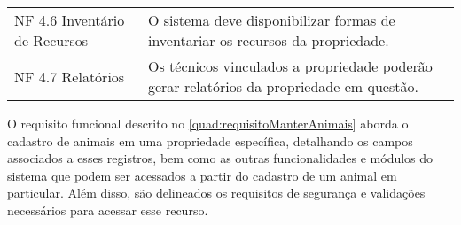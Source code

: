 \begin{tabframed}[htb]
\begin{tabular}{|l|l|}
    NF 4.6 Inventário de Recursos         &
    \multicolumn{1}{|p{9cm}|}{\raggedright O sistema deve disponibilizar formas de inventariar os recursos da propriedade.}
    \\ \cline{1-2}

    NF 4.7 Relatórios                     &
    \multicolumn{1}{|p{9cm}|}{\raggedright Os técnicos vinculados a propriedade poderão gerar relatórios da propriedade em questão.}
    \\ \cline{1-2}
  \end{tabular}
  \fonte{} %
\end{tabframed}

\clearpage

O requisito funcional descrito no \autoref{quad:requisitoManterAnimais} aborda o cadastro de animais em uma propriedade específica, detalhando os campos associados a esses registros, bem como as outras funcionalidades e módulos do sistema que podem ser acessados a partir do cadastro de um animal em particular. Além disso, são delineados os requisitos de segurança e validações necessários para acessar esse recurso.


